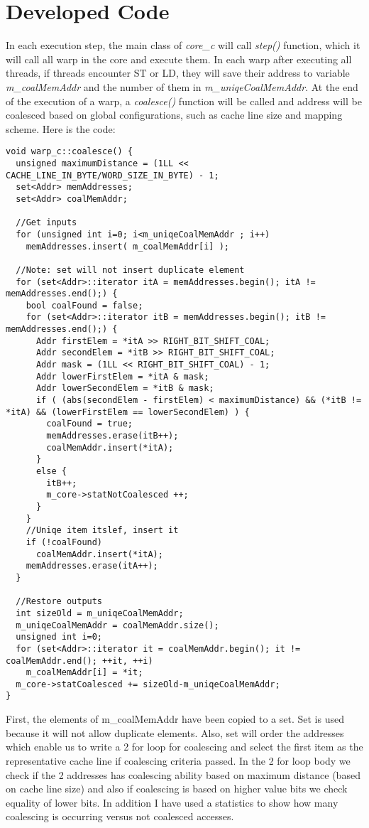 \documentclass{article}
\begin{document}
\section{Developed Code}
In each execution step, the main class of \emph{core\_c} will call \emph{step()} function, which it will call all warp in the core and execute them. In each warp after executing all threads, if threads encounter ST or LD, they will save their address to variable \emph{m\_coalMemAddr} and the number of them in \emph{m\_uniqeCoalMemAddr}. At the end of the execution of a warp, a \emph{coalesce()} function will be called and address will be coalesced based on global configurations, such as cache line size and mapping scheme. Here is the code:
\begin{lstlisting}
void warp_c::coalesce() {
  unsigned maximumDistance = (1LL << CACHE_LINE_IN_BYTE/WORD_SIZE_IN_BYTE) - 1;
  set<Addr> memAddresses;
  set<Addr> coalMemAddr;

  //Get inputs
  for (unsigned int i=0; i<m_uniqeCoalMemAddr ; i++)
    memAddresses.insert( m_coalMemAddr[i] );

  //Note: set will not insert duplicate element
  for (set<Addr>::iterator itA = memAddresses.begin(); itA != memAddresses.end();) {
    bool coalFound = false;
    for (set<Addr>::iterator itB = memAddresses.begin(); itB != memAddresses.end();) {
      Addr firstElem = *itA >> RIGHT_BIT_SHIFT_COAL;
      Addr secondElem = *itB >> RIGHT_BIT_SHIFT_COAL;
      Addr mask = (1LL << RIGHT_BIT_SHIFT_COAL) - 1;
      Addr lowerFirstElem = *itA & mask;
      Addr lowerSecondElem = *itB & mask;
      if ( (abs(secondElem - firstElem) < maximumDistance) && (*itB != *itA) && (lowerFirstElem == lowerSecondElem) ) {
        coalFound = true;
        memAddresses.erase(itB++);
        coalMemAddr.insert(*itA);
      }
      else {
        itB++;
		m_core->statNotCoalesced ++;
      }
    }
    //Uniqe item itslef, insert it
    if (!coalFound)
      coalMemAddr.insert(*itA);
    memAddresses.erase(itA++);
  }

  //Restore outputs
  int sizeOld = m_uniqeCoalMemAddr;
  m_uniqeCoalMemAddr = coalMemAddr.size();
  unsigned int i=0;
  for (set<Addr>::iterator it = coalMemAddr.begin(); it != coalMemAddr.end(); ++it, ++i) 
    m_coalMemAddr[i] = *it;
  m_core->statCoalesced += sizeOld-m_uniqeCoalMemAddr;
}
\end{lstlisting}
First, the elements of m\_coalMemAddr have been copied to a set. Set is used because it will not allow duplicate elements. Also, set will order the addresses which enable us to write a 2 for loop for coalescing and select the first item as the representative cache line if coalescing criteria passed. In the 2 for loop body we check if the 2 addresses has coalescing ability based on maximum distance (based on cache line size) and also if coalescing is based on higher value bits we check equality of lower bits.
In addition I have used a statistics to show how many coalescing is occurring versus not coalesced accesses.
\end{document}
